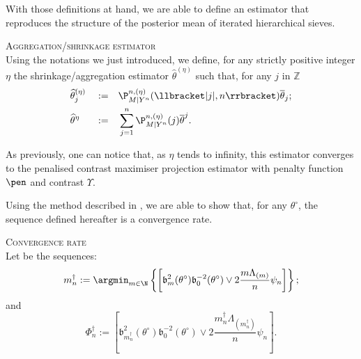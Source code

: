 With those definitions at hand, we are able to define an estimator that reproduces the structure of the posterior mean of iterated hierarchical sieves.

\begin{de}{\textsc{Aggregation/shrinkage estimator} \\}\label{DEFREQ_CIRCDECONV_KNOWN_IID_AGGREGEST}
Using the notations we just introduced, we define, for any strictly positive integer $\eta$ the shrinkage/aggregation estimator $\widehat{\theta}^{(\eta)}$ such that, for any $j$ in $\mathds{Z}$
\begin{alignat*}{3}
& \widehat{\theta}^{(\eta)}_{j} && := && \P_{M \vert Y^{n}}^{n, (\eta)}(\llbracket \vert j \vert, n \rrbracket) \overline{\theta}_{j};\\
& \widehat{\theta}^{\eta} && := && \sum\limits_{j = 1}^{n} \P_{M \vert Y^{n}}^{n, (\eta)}(j) \overline{\theta}^{j}.
\end{alignat*}
\end{de}

As previously, one can notice that, as $\eta$ tends to infinity, this estimator converges to the penalised contrast maximiser projection estimator with penalty function $\pen$ and contrast $\Upsilon$.

Using the method described in , we are able to show that, for any $\theta^{\circ}$, the sequence defined hereafter is a convergence rate.

\begin{de}{\textsc{Convergence rate} \\}\label{DE_FREQ_CIRCDECONV_KNOWN_IID_CONVRATE}
Let be the sequences:
\[m^{\dagger}_{n} := \argmin_{m \in \N}\left\{\left[\mathfrak{b}_{m}^{2}(\theta^{\circ})\mathfrak{b}_{0}^{-2}(\theta^{\circ}) \vee 2 \frac{m \Lambda_{(m)}}{n} \psi_{n}\right]\right\};\]
and
\[\Phi^{\dagger}_{n} := \left[\mathfrak{b}_{m^{\dagger}_{n}}^{2}(\theta^{\circ})\mathfrak{b}_{0}^{-2}(\theta^{\circ}) \vee 2 \frac{m^{\dagger}_{n} \Lambda_{(m^{\dagger}_{n})}}{n} \psi_{n}\right].\]
\end{de}

\bigskip

